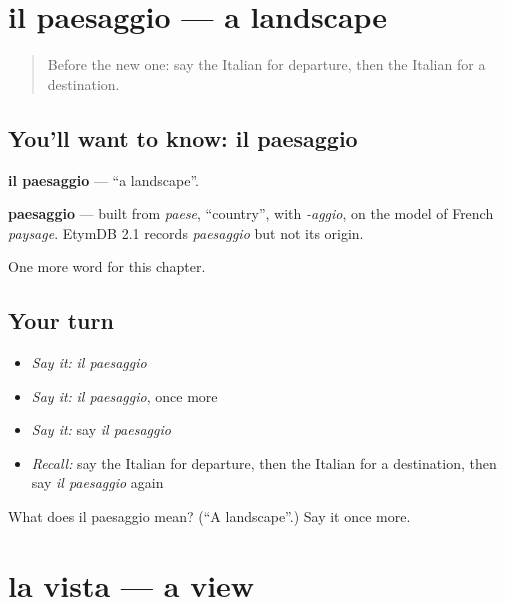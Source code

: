 \section[il paesaggio]{il paesaggio — a landscape}

\label{lesson:IT-C171-paesaggio}



\begin{quote}
Before the new one: say the Italian for departure, then the Italian for a destination.
\end{quote}

\subsection*{You'll want to know: il paesaggio}
\textbf{il paesaggio} — \textquotedblleft{}a landscape\textquotedblright{}.

\begin{cousinweb}
\textbf{paesaggio} — built from \emph{paese}, \textquotedblleft{}country\textquotedblright{}, with \emph{-aggio}, on the model of French \emph{paysage}. EtymDB 2.1 records \emph{paesaggio} but not its origin.
\end{cousinweb}

\begin{grammarlens}[title={What you've built}]
One more word for this chapter.
\end{grammarlens}

\subsection*{Your turn}
\begin{itemize}
\raggedright
  \item \emph{Say it:} \emph{il paesaggio}
  \item \emph{Say it:} \emph{il paesaggio}, once more
  \item \emph{Say it:} say \emph{il paesaggio}
  \item \emph{Recall:} say the Italian for departure, then the Italian for a destination, then say \emph{il paesaggio} again
\end{itemize}

\begin{tcolorbox}[breakable,colback=teal!4,colframe=teal!35!black,title={Before you move on}]
What does il paesaggio mean? (\textquotedblleft{}A landscape\textquotedblright{}.) Say it once more.
\end{tcolorbox}
\section[la vista]{la vista — a view}

